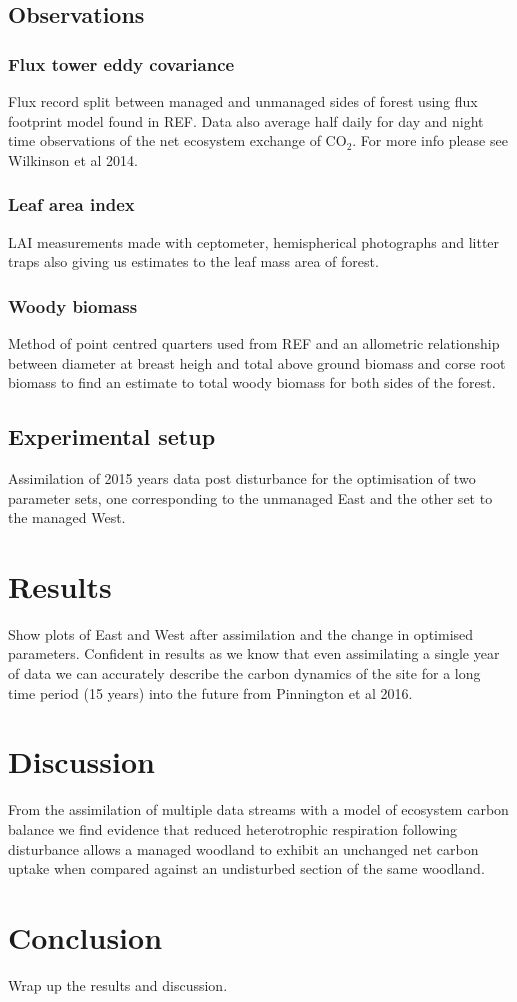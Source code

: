 \documentclass[11pt]{article}
\begin{document}
\subsection{Observations}
\subsubsection{Flux tower eddy covariance}
Flux record split between managed and unmanaged sides of forest using flux footprint model found in REF. Data also average half daily for day and night time observations of the net ecosystem exchange of CO\(_{2}\). For more info please see Wilkinson et al 2014.
\subsubsection{Leaf area index}
LAI measurements made with ceptometer, hemispherical photographs and litter traps also giving us estimates to the leaf mass area of forest.
\subsubsection{Woody biomass}  
Method of point centred quarters used from REF and an allometric relationship between diameter at breast heigh and total above ground biomass and corse root biomass to find an estimate to total woody biomass for both sides of the forest.

\subsection{Experimental setup}
Assimilation of 2015 years data post disturbance for the optimisation of two parameter sets, one corresponding to the unmanaged East and the other set to the managed West.

\section{Results}
Show plots of East and West after assimilation and the change in optimised parameters. Confident in results as we know that even assimilating a single year of data we can accurately describe the carbon dynamics of the site for a long time period (15 years) into the future from Pinnington et al 2016.

\section{Discussion}
From the assimilation of multiple data streams with a model of ecosystem carbon balance we find evidence that reduced heterotrophic respiration following disturbance allows a managed woodland to exhibit an unchanged net carbon uptake when compared against an undisturbed section of the same woodland. 

\section{Conclusion}
Wrap up the results and discussion.


{}
\end{document}
